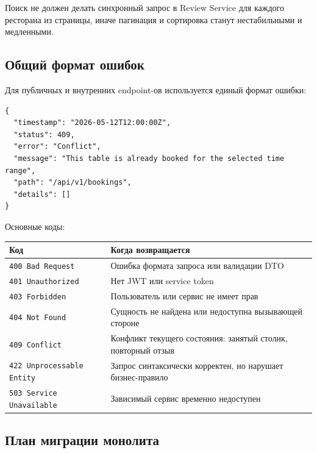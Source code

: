 \documentclass[14pt,a4paper]{extarticle}
\newcommand{\code}[1]{\texttt{#1}}
\begin{document}
Поиск не должен делать синхронный запрос в Review Service для каждого ресторана из страницы, иначе пагинация и сортировка станут нестабильными и медленными.

\subsection{Общий формат ошибок}

Для публичных и внутренних endpoint-ов используется единый формат ошибки:

\begin{lstlisting}[style=jsonstyle]
{
  "timestamp": "2026-05-12T12:00:00Z",
  "status": 409,
  "error": "Conflict",
  "message": "This table is already booked for the selected time range",
  "path": "/api/v1/bookings",
  "details": []
}
\end{lstlisting}

Основные коды:

\begin{longtable}{|L{0.25\textwidth}|L{0.65\textwidth}|}
\hline
\textbf{Код} & \textbf{Когда возвращается} \\
\hline
\code{400 Bad Request} & Ошибка формата запроса или валидации DTO \\
\hline
\code{401 Unauthorized} & Нет JWT или service token \\
\hline
\code{403 Forbidden} & Пользователь или сервис не имеет прав \\
\hline
\code{404 Not Found} & Сущность не найдена или недоступна вызывающей стороне \\
\hline
\code{409 Conflict} & Конфликт текущего состояния: занятый столик, повторный отзыв \\
\hline
\code{422 Unprocessable Entity} & Запрос синтаксически корректен, но нарушает бизнес-правило \\
\hline
\code{503 Service Unavailable} & Зависимый сервис временно недоступен \\
\hline
\end{longtable}

\subsection{План миграции монолита}
\end{document}
